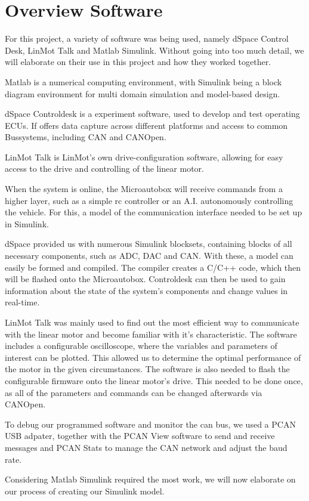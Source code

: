 
\chapter{Overview Software}
\label{chp:Software}

For this project, a variety of software was being used, namely dSpace Control Desk, LinMot Talk and Matlab Simulink. Without going into too much detail, we will elaborate on their use in this project and how they worked together.


Matlab is a numerical computing environment, with Simulink being a block diagram environment for multi domain simulation and model-based design.

dSpace Controldesk is a experiment software, used to develop and test operating ECUs. If offers data capture across different platforms and access to common Bussystems, including CAN and CANOpen.

LinMot Talk is LinMot's own drive-configuration software, allowing for easy access to the drive and controlling of the linear motor.

When the system is online, the Microautobox will receive commands from a higher layer, such as a simple rc controller or an A.I. autonomously controlling the vehicle. For this, a model of the communication interface needed to be set up in Simulink.

dSpace provided us with numerous Simulink blocksets, containing blocks of all necessary components, such as ADC, DAC and CAN. With these, a model can easily be formed and compiled. The compiler creates a C/C++ code, which then will be flashed onto the Microautobox. Controldesk can then be used to gain information about the state of the system's components and change values in real-time.

LinMot Talk was mainly used to find out the most efficient way to communicate with the linear motor and become familiar with it's characteristic. The software includes a configurable oscilloscope, where the variables and parameters of interest can be plotted. This allowed us to determine the optimal performance of the motor in the given circumstances.
The software is also needed to flash the configurable firmware onto the linear motor's drive. This needed to be done once, as all of the parameters and commands can be changed afterwards via CANOpen.

To debug our programmed software and monitor the can bus, we used a PCAN USB adpater, together with the PCAN View software to send and receive messages and PCAN Stats to manage the CAN network and adjust the baud rate.



Considering Matlab Simulink required the most work, we will now elaborate on our process of creating our Simulink model.
